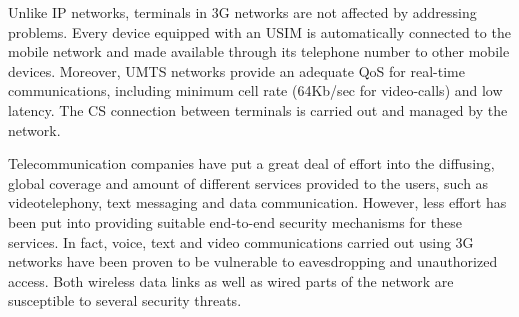 \documentclass[10pt, conference, compsocconf]{IEEEtran}
\begin{document}
Unlike IP networks, terminals in 3G networks are not affected by addressing problems. Every device equipped with an USIM is automatically connected to the mobile network and made available through its telephone number to other mobile devices. Moreover, UMTS networks provide an adequate QoS for real-time communications, including minimum cell rate (64Kb/sec for video-calls) and low latency. The CS connection between terminals is carried out and managed by the network.

Telecommunication companies have put a great deal of effort into the diffusing, global coverage and amount of different services provided to the users, such as videotelephony, text messaging and data communication. However, less effort has been put into providing suitable end-to-end security mechanisms for these services. In fact, voice, text and video communications carried out using 3G networks have been proven to be vulnerable to eavesdropping and unauthorized access. Both wireless data links as well as wired parts of the network are susceptible to several security threats.



\end{document}
